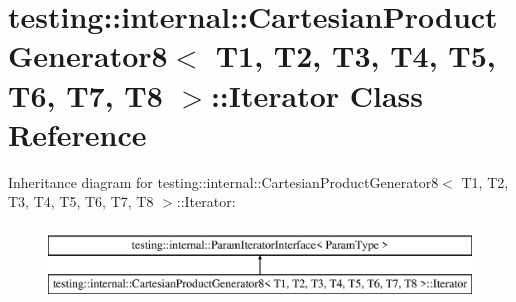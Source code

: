 \hypertarget{classtesting_1_1internal_1_1_cartesian_product_generator8_1_1_iterator}{}\section{testing\+:\+:internal\+:\+:Cartesian\+Product\+Generator8$<$ T1, T2, T3, T4, T5, T6, T7, T8 $>$\+:\+:Iterator Class Reference}
\label{classtesting_1_1internal_1_1_cartesian_product_generator8_1_1_iterator}
Inheritance diagram for testing\+:\+:internal\+:\+:Cartesian\+Product\+Generator8$<$ T1, T2, T3, T4, T5, T6, T7, T8 $>$\+:\+:Iterator\+:\begin{figure}[H]
\begin{center}
\leavevmode
\includegraphics[height=2.000000cm]{classtesting_1_1internal_1_1_cartesian_product_generator8_1_1_iterator}
\end{center}
\end{figure}
